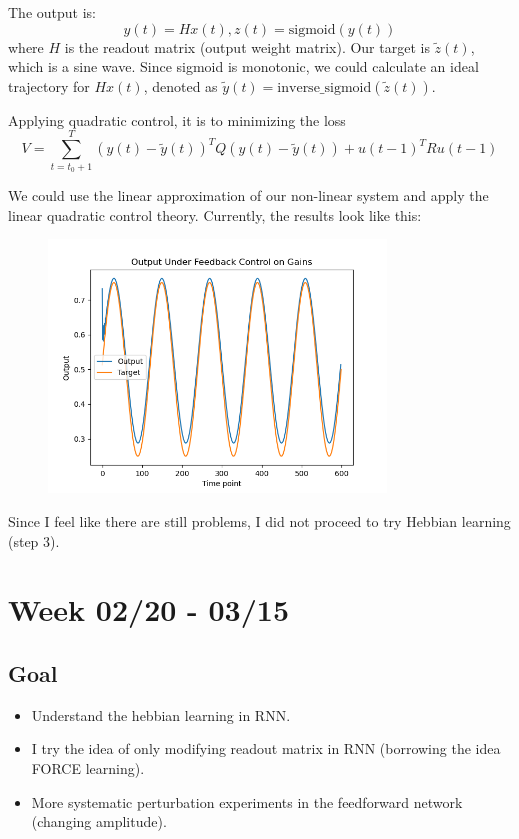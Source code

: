 \documentclass[12pt, a4paper]{article}
\begin{document}
The output is:
$$y(t) = Hx(t), z(t) = \text{sigmoid}(y(t))$$
where $H$ is the readout matrix (output weight matrix). Our target is $\tilde{z}(t)$, which is a sine wave. Since sigmoid is monotonic, we could calculate an ideal trajectory for $Hx(t)$, denoted as $\tilde{y}(t) = \text{inverse\_sigmoid}(\tilde{z}(t))$.

Applying quadratic control, it is to minimizing the loss $$V = \sum_{t=t_0+1}^T (y(t) - \tilde{y}(t))^T Q (y(t)- \tilde{y}(t)) + u(t-1)^T R u(t-1)$$

We could use the linear approximation of our non-linear system and apply the linear quadratic control theory. Currently, the results look like this:

\begin{figure}[H]
    \centering
    \includegraphics[width=0.8\textwidth]{RNN/FORCE/fig/FORCE_tracking_output.png} \\
\end{figure}

Since I feel like there are still problems, I did not proceed to try Hebbian learning (step 3). 

\newpage


\section*{Week 02/20 - 03/15}

\subsection*{Goal}

\noindent
\begin{itemize}
    \item Understand the hebbian learning in RNN.
    \item I try the idea of only modifying readout matrix in RNN (borrowing the idea FORCE learning).
    \item More systematic perturbation experiments in the feedforward network (changing amplitude).

\end{itemize}
\end{document}
